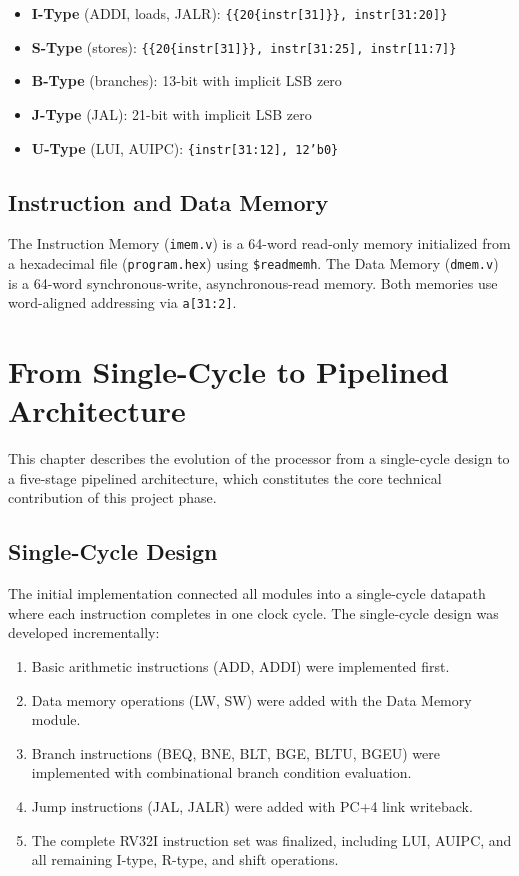 \documentclass[12pt,a4paper]{report}
\begin{document}
\begin{itemize}
    \item \textbf{I-Type} (ADDI, loads, JALR): \texttt{\{\{20\{instr[31]\}\}, instr[31:20]\}}
    \item \textbf{S-Type} (stores): \texttt{\{\{20\{instr[31]\}\}, instr[31:25], instr[11:7]\}}
    \item \textbf{B-Type} (branches): 13-bit with implicit LSB zero
    \item \textbf{J-Type} (JAL): 21-bit with implicit LSB zero
    \item \textbf{U-Type} (LUI, AUIPC): \texttt{\{instr[31:12], 12'b0\}}
\end{itemize}

\section{Instruction and Data Memory}
The Instruction Memory (\texttt{imem.v}) is a 64-word read-only memory initialized
from a hexadecimal file (\texttt{program.hex}) using \texttt{\$readmemh}. The Data
Memory (\texttt{dmem.v}) is a 64-word synchronous-write, asynchronous-read memory.
Both memories use word-aligned addressing via \texttt{a[31:2]}.


\chapter{From Single-Cycle to Pipelined Architecture}

This chapter describes the evolution of the processor from a single-cycle design to a
five-stage pipelined architecture, which constitutes the core technical contribution
of this project phase.

\section{Single-Cycle Design}
The initial implementation connected all modules into a single-cycle datapath where
each instruction completes in one clock cycle. The single-cycle design was developed
incrementally:

\begin{enumerate}
    \item Basic arithmetic instructions (ADD, ADDI) were implemented first.
    \item Data memory operations (LW, SW) were added with the Data Memory module.
    \item Branch instructions (BEQ, BNE, BLT, BGE, BLTU, BGEU) were implemented
          with combinational branch condition evaluation.
    \item Jump instructions (JAL, JALR) were added with PC+4 link writeback.
    \item The complete RV32I instruction set was finalized, including LUI, AUIPC,
          and all remaining I-type, R-type, and shift operations.
\end{enumerate}
\end{document}
